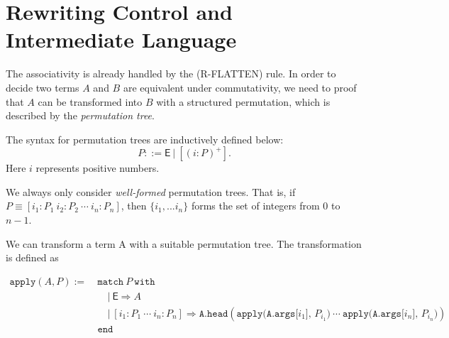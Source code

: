 \documentclass{article}
\begin{document}
\section{Rewriting Control and Intermediate Language}
The associativity is already handled by the (R-FLATTEN) rule. In order to decide two terms $A$ and $B$ are equivalent under commutativity, we need to proof that $A$ can be transformed into $B$ with a structured permutation, which is described by the \textit{permutation tree}.

\begin{definition}
    The syntax for permutation trees are inductively defined below:
    \[
    P ::= \mathsf{E}\ |\ [(i:P)^+].
    \]
    Here $i$ represents positive numbers.
\end{definition}
We always only consider \textit{well-formed} permutation trees. That is, if $P \equiv [i_1:P_1\ i_2:P_2\ \cdots\ i_n:P_n]$, then $\{i_1, ... i_n\}$ forms the set of integers from $0$ to $n-1$.

We can transform a term A with a suitable permutation tree. The transformation is defined as

\begin{align*}
    \texttt{apply}(A, P) :=\ & \texttt{match}\ P\ \texttt{with} \\
    & \quad |\ \textsf{E} \Rightarrow A \\
    & \quad |\ [i_1:P_1\ \cdots\ i_n:P_n] \Rightarrow \texttt{A.head}(\texttt{apply(A.args[$i_1$], $P_{i_1}$)}\ \cdots\ \texttt{apply(A.args[$i_n$], $P_{i_n}$)}) \\
    & \texttt{end}
\end{align*}

\clearpage



\clearpage



\end{document}

